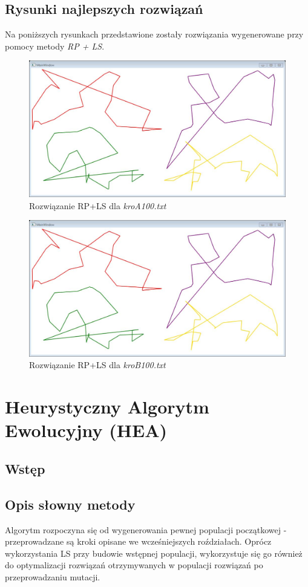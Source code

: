 \documentclass{article}
\begin{document}
\subsection{Rysunki najlepszych rozwiązań}
Na poniższych rysunkach przedstawione zostały rozwiązania wygenerowane przy pomocy metody \emph{RP + LS}.
\begin{figure}[h!]
\centering\includegraphics[width=17cm]{img/rys2.png}
\caption{Rozwiązanie RP+LS dla \emph{kroA100.txt}}
\end{figure}
\begin{figure}[h!]
\centering\includegraphics[width=17cm]{img/rys3.png}
\caption{Rozwiązanie RP+LS dla \emph{kroB100.txt}}
\end{figure}


\section{Heurystyczny Algorytm Ewolucyjny (HEA)}
\subsection{Wstęp}

\subsection{Opis słowny metody}
Algorytm rozpoczyna się od wygenerowania pewnej populacji początkowej - przeprowadzane są kroki opisane we wcześniejszych roździałach. Oprócz wykorzystania LS przy budowie wstępnej populacji, wykorzystuje się go również do optymalizacji rozwiązań otrzymywanych w populacji rozwiązań po przeprowadzaniu mutacji.
\end{document}
